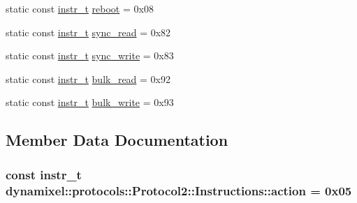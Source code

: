 \begin{DoxyCompactItemize}
\item 
static const \hyperlink{classdynamixel_1_1protocols_1_1_protocol2_aa7302f20356607bd51e4d4ecf4cb7abf}{instr\+\_\+t} \hyperlink{structdynamixel_1_1protocols_1_1_protocol2_1_1_instructions_adea65ed9e07cae36e62cc0fabaf2e684}{reboot} = 0x08
\item 
static const \hyperlink{classdynamixel_1_1protocols_1_1_protocol2_aa7302f20356607bd51e4d4ecf4cb7abf}{instr\+\_\+t} \hyperlink{structdynamixel_1_1protocols_1_1_protocol2_1_1_instructions_aba6babc271a5d2b8fc21a88ac77573dd}{sync\+\_\+read} = 0x82
\item 
static const \hyperlink{classdynamixel_1_1protocols_1_1_protocol2_aa7302f20356607bd51e4d4ecf4cb7abf}{instr\+\_\+t} \hyperlink{structdynamixel_1_1protocols_1_1_protocol2_1_1_instructions_a4187ed3c1dbf41b31155b02c98516d7d}{sync\+\_\+write} = 0x83
\item 
static const \hyperlink{classdynamixel_1_1protocols_1_1_protocol2_aa7302f20356607bd51e4d4ecf4cb7abf}{instr\+\_\+t} \hyperlink{structdynamixel_1_1protocols_1_1_protocol2_1_1_instructions_ac25d5d672f7b6e14d21bf6292c3822fa}{bulk\+\_\+read} = 0x92
\item 
static const \hyperlink{classdynamixel_1_1protocols_1_1_protocol2_aa7302f20356607bd51e4d4ecf4cb7abf}{instr\+\_\+t} \hyperlink{structdynamixel_1_1protocols_1_1_protocol2_1_1_instructions_a0d01472800d0b0bf7531dd0396db3838}{bulk\+\_\+write} = 0x93
\end{DoxyCompactItemize}


\subsection{Member Data Documentation}
\hypertarget{structdynamixel_1_1protocols_1_1_protocol2_1_1_instructions_a1f15f30aea4c4e316d5ba15eddcaf49b}{}
\subsubsection[{action}]{\setlength{\rightskip}{0pt plus 5cm}const {\bf instr\+\_\+t} dynamixel\+::protocols\+::\+Protocol2\+::\+Instructions\+::action = 0x05\hspace{0.3cm}{\ttfamily [static]}}\label{structdynamixel_1_1protocols_1_1_protocol2_1_1_instructions_a1f15f30aea4c4e316d5ba15eddcaf49b}
\hypertarget{structdynamixel_1_1protocols_1_1_protocol2_1_1_instructions_ac25d5d672f7b6e14d21bf6292c3822fa}{}
